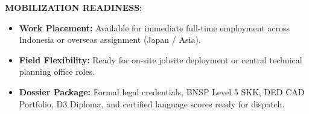 \documentclass[10pt,a4paper,landscape]{article}
\begin{document}
\begin{minipage}[t]{0.32\linewidth}
  \begin{tcolorbox}[sharp corners, boxrule=0.6pt, colframe=pnavy, colback=pbglight, left=2.5mm, right=2.5mm, top=2mm, bottom=2mm, height=52mm]
    {\fontsize{7pt}{8.5pt}\selectfont\bfseries\color{pnavy}MOBILIZATION READINESS:}\\[1.5mm]
    {\fontsize{6.3pt}{8.2pt}\selectfont\color{psteel}
    \begin{itemize}[leftmargin=3.5mm, itemsep=1.2mm, topsep=0mm, parsep=0mm]
      \item \textbf{Work Placement:} Available for immediate full-time employment across Indonesia or overseas assignment (Japan / Asia).
      \item \textbf{Field Flexibility:} Ready for on-site jobsite deployment or central technical planning office roles.
      \item \textbf{Dossier Package:} Formal legal credentials, BNSP Level 5 SKK, DED CAD Portfolio, D3 Diploma, and certified language scores ready for dispatch.
    \end{itemize}
    }
  \end{tcolorbox}
\end{minipage}%
\hfill
\end{document}
